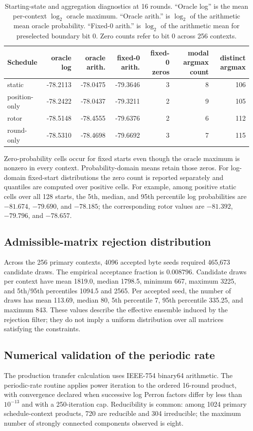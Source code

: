 \documentclass[cryptography,supfile,submit,oneauthor]{Definitions/mdpi}
\begin{document}
\begin{table}[h]
\centering\scriptsize
\caption{Starting-state and aggregation diagnostics at 16 rounds. ``Oracle log'' is the mean per-context $\log_2$ oracle maximum. ``Oracle arith.'' is $\log_2$ of the arithmetic mean oracle probability. ``Fixed-0 arith.'' is $\log_2$ of the arithmetic mean for preselected boundary bit 0. Zero counts refer to bit 0 across 256 contexts.}
\begin{tabular}{lrrrrrr}
\toprule
Schedule & oracle log & oracle arith. & fixed-0 arith. & fixed-0 zeros & modal argmax count & distinct argmax\\
\midrule
static & -78.2113 & -78.0475 & -79.3646 & 3 & 8 & 106\\
position-only & -78.2422 & -78.0437 & -79.3211 & 2 & 9 & 105\\
rotor & -78.5148 & -78.4555 & -79.6376 & 2 & 6 & 112\\
round-only & -78.5310 & -78.4698 & -79.6692 & 3 & 7 & 115\\
\bottomrule
\end{tabular}
\end{table}

Zero-probability cells occur for fixed starts even though the oracle maximum is nonzero in every context. Probability-domain means retain those zeros. For log-domain fixed-start distributions the zero count is reported separately and quantiles are computed over positive cells. For example, among positive static cells over all 128 starts, the 5th, median, and 95th percentile log probabilities are $-81.674$, $-79.690$, and $-78.185$; the corresponding rotor values are $-81.392$, $-79.796$, and $-78.657$.

\subsection{Admissible-matrix rejection distribution}
Across the 256 primary contexts, 4096 accepted byte seeds required 465,673 candidate draws. The empirical acceptance fraction is $0.008796$. Candidate draws per context have mean 1819.0, median 1798.5, minimum 667, maximum 3225, and 5th/95th percentiles 1094.5 and 2565. Per accepted seed, the number of draws has mean 113.69, median 80, 5th percentile 7, 95th percentile 335.25, and maximum 843. These values describe the effective ensemble induced by the rejection filter; they do not imply a uniform distribution over all matrices satisfying the constraints.

\subsection{Numerical validation of the periodic rate}
The production transfer calculation uses IEEE-754 binary64 arithmetic. The periodic-rate routine applies power iteration to the ordered 16-round product, with convergence declared when successive log Perron factors differ by less than $10^{-13}$ and with a 250-iteration cap. Reducibility is common: among 1024 primary schedule-context products, 720 are reducible and 304 irreducible; the maximum number of strongly connected components observed is eight.
\end{document}
